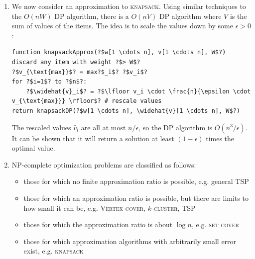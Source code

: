 \documentclass[10pt]{article}
\begin{document}
\begin{multicols}{2}
\begin{addmargin}[0.8em]{0.5em}
\begin{enumerate}[label=(\alph*)]
        There is no polynomial-time finite approximation for general TSP, in which there is no metric. 
        The idea is to alter the reduction given in \textsc{Rudrata Cycle} $\rightarrow$ \textsc{TSP} by replacing the edge weight 2 with a specific (large) value so that any approximate solution solves the decision problem of Rudrata path.
        
        \item We now consider an approximation to \textsc{knapsack}. Using similar techniques to the $O(nW)$ DP algorithm, there is a $O(nV)$ DP algorithm where $V$ is the sum of values of the items. The idea is to scale the values down by some $\epsilon > 0$:
        \begin{verbatim}
function knapsackApprox(?$w[1 \cdots n], v[1 \cdots n], W$?)
discard any item with weight ?$> W$?
?$v_{\text{max}}$? = max?$_i$? ?$v_i$?
for ?$i=1$? to ?$n$?:
    ?$\widehat{v}_i$? = ?$\lfloor v_i \cdot \frac{n}{\epsilon \cdot v_{\text{max}}} \rfloor$? # rescale values
return knapsackDP(?$w[1 \cdots n], \widehat{v}[1 \cdots n], W$?)
        \end{verbatim}   
        The rescaled values $\widehat{v}_i$ are all at most $n/\epsilon$, so the DP algorithm is $O(n^3 / \epsilon)$. It can be shown that it will return a solution at least $(1 - \epsilon)$ times the optimal value.
        
        \item NP-complete optimization problems are classified as follows: 
        \begin{itemize}
        \item those for which no finite approximation ratio is possible, e.g. general \textsc{TSP}
        \item those for which an approximation ratio is possible, but there are limits to how small it can be, e.g. \textsc{Vertex cover}, $k$-\textsc{cluster}, \textsc{TSP}
        \item those for which the approximation ratio is about $\log{n}$, e.g. \textsc{set cover}
        \item those for which approximation algorithms with arbitrarily small error exist, e.g. \textsc{knapsack}
        \end{itemize}

    \end{enumerate}    
    \vspace{-0.2cm}

\end{addmargin}
\end{multicols}
\end{document}
